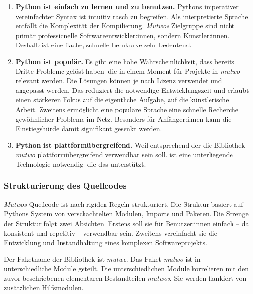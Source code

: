 \documentclass[12pt,a4paper,ngerman]{article}
\begin{document}
\begin{enumerate}
    \item{
            \textbf{Python ist einfach zu lernen und zu benutzen.}
            Pythons imperativer vereinfachter Syntax ist intuitiv rasch zu begreifen.
            Als interpretierte Sprache entfällt die Komplexität der Kompilierung.
            \emph{Mutwos} Zielgruppe sind nicht primär professionelle Softwareentwickler:innen, sondern Künstler:innen.
            Deshalb ist eine flache, schnelle Lernkurve sehr bedeutend.
    }
    \item{
            \textbf{Python ist populär.}
            Es gibt eine hohe Wahrscheinlichkeit, dass bereits Dritte Probleme gelöst haben, die in einem Moment für Projekte in \emph{mutwo} relevant werden.
            Die Lösungen können je nach Lizenz verwendet und angepasst werden.
            Das reduziert die notwendige Entwicklungszeit und erlaubt einen stärkeren Fokus auf die eigentliche Aufgabe, auf die künstlerische Arbeit.
            Zweitens ermöglicht eine populäre Sprache eine schnelle Recherche gewöhnlicher Probleme im Netz.
            Besonders für Anfänger:innen kann die Einstiegshürde damit signifikant gesenkt werden.
    }
    \item{
            \textbf{Python ist plattformübergreifend.}
            Weil entsprechend der \emph{} die Bibliothek \emph{mutwo} plattformübergreifend verwendbar sein soll, ist eine unterliegende Technologie notwendig, die das unterstützt.
    }
\end{enumerate}


\subsubsection{Strukturierung des Quellcodes}
\label{quellcodeStruktur}

\emph{Mutwos} Quellcode ist nach rigiden Regeln strukturiert.
Die Struktur basiert auf Pythons System von verschachtelten Modulen, Importe und Paketen.
Die Strenge der Struktur folgt zwei Absichten.
Erstens soll sie für Benutzer:innen einfach -- da konsistent und repetitiv -- verwendbar sein.
Zweitens vereinfacht sie die Entwicklung und Instandhaltung eines komplexen Softwareprojekts.

\bigskip

Der Paketname der Bibliothek ist \emph{mutwo}.
% 
% 
% 
Das Paket \emph{mutwo} ist in unterschiedliche Module geteilt.
Die unterschiedlichen Module korrelieren mit den zuvor beschriebenen elementaren Bestandteilen \emph{mutwos}.
Sie werden flankiert von zusätzlichen Hilfsmodulen.
\end{document}
